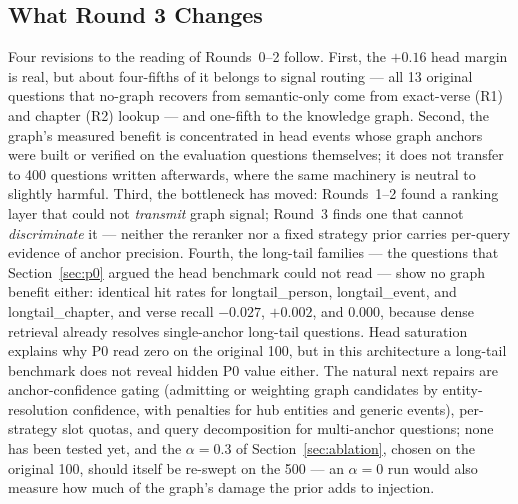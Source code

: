\subsection{What Round 3 Changes}

Four revisions to the reading of Rounds~0--2 follow. First, the
$+0.16$ head margin is real, but about four-fifths of it belongs to
signal routing --- all 13 original questions that no-graph recovers from
semantic-only come from exact-verse (R1) and chapter (R2) lookup ---
and one-fifth to the knowledge graph. Second, the
graph's measured benefit is concentrated in head events whose graph
anchors were built or verified on the evaluation questions themselves;
it does not transfer to 400 questions written afterwards, where the
same machinery is neutral to slightly harmful. Third, the bottleneck
has moved: Rounds~1--2 found a ranking layer that could not
\emph{transmit} graph signal; Round~3 finds one that cannot
\emph{discriminate} it --- neither the reranker nor a fixed strategy
prior carries per-query evidence of anchor precision. Fourth, the
long-tail families --- the questions that Section~\ref{sec:p0} argued
the head benchmark could not read --- show no graph benefit either:
identical hit rates for longtail\_person, longtail\_event, and
longtail\_chapter, and verse recall $-0.027$, $+0.002$, and $0.000$,
because dense retrieval already resolves single-anchor long-tail
questions. Head saturation explains why P0 read zero on the original
100, but in this architecture a long-tail benchmark does not reveal
hidden P0 value either. The natural next repairs are anchor-confidence
gating (admitting or weighting graph candidates by entity-resolution
confidence, with penalties for hub entities and generic events),
per-strategy slot quotas, and query decomposition for multi-anchor
questions; none has been tested yet, and the $\alpha=0.3$ of
Section~\ref{sec:ablation}, chosen on the original 100, should itself be
re-swept on the 500 --- an $\alpha=0$ run would also measure how much of
the graph's damage the prior adds to injection.
